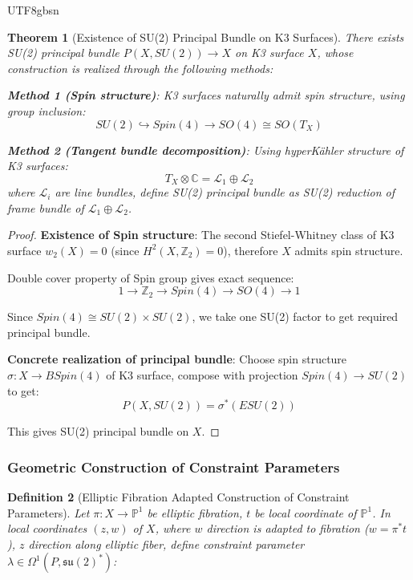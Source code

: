 \documentclass[a4paper,12pt]{extarticle}
\newtheorem{theorem}{Theorem}[section]
\newtheorem{definition}[theorem]{Definition}
\theoremstyle{definition}
\begin{document}
\begin{CJK}{UTF8}{gbsn}
\begin{theorem}[Existence of SU(2) Principal Bundle on K3 Surfaces]
\label{thm:su2_bundle_existence}
There exists SU(2) principal bundle $P(X, SU(2)) \to X$ on K3 surface $X$, whose construction is realized through the following methods:

\textbf{Method 1 (Spin structure)}: K3 surfaces naturally admit spin structure, using group inclusion:
$$SU(2) \hookrightarrow Spin(4) \to SO(4) \cong SO(T_X)$$

\textbf{Method 2 (Tangent bundle decomposition)}: Using hyperKähler structure of K3 surfaces:
$$T_X \otimes \mathbb{C} = \mathcal{L}_1 \oplus \mathcal{L}_2$$
where $\mathcal{L}_i$ are line bundles, define SU(2) principal bundle as SU(2) reduction of frame bundle of $\mathcal{L}_1 \oplus \mathcal{L}_2$.
\end{theorem}

\begin{proof}
\textbf{Existence of Spin structure}:
The second Stiefel-Whitney class of K3 surface $w_2(X) = 0$ (since $H^2(X, \mathbb{Z}_2) = 0$), therefore $X$ admits spin structure.

Double cover property of Spin group gives exact sequence:
$$1 \to \mathbb{Z}_2 \to Spin(4) \to SO(4) \to 1$$

Since $Spin(4) \cong SU(2) \times SU(2)$, we take one SU(2) factor to get required principal bundle.

\textbf{Concrete realization of principal bundle}:
Choose spin structure $\sigma: X \to BSpin(4)$ of K3 surface, compose with projection $Spin(4) \to SU(2)$ to get:
$$P(X, SU(2)) = \sigma^*(ESU(2))$$

This gives SU(2) principal bundle on $X$.
\end{proof}

\subsubsection{Geometric Construction of Constraint Parameters}
\label{subsubsec:constraint_parameter_construction}

\begin{definition}[Elliptic Fibration Adapted Construction of Constraint Parameters]
\label{def:constraint_parameter_elliptic}
Let $\pi: X \to \mathbb{P}^1$ be elliptic fibration, $t$ be local coordinate of $\mathbb{P}^1$. In local coordinates $(z, w)$ of $X$, where $w$ direction is adapted to fibration ($w = \pi^*t$), $z$ direction along elliptic fiber, define constraint parameter $\lambda \in \Omega^1(P, \mathfrak{su}(2)^*)$:


\end{definition}
\end{CJK}
\end{document}
